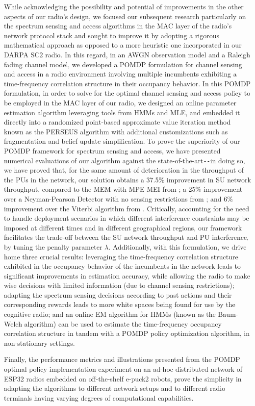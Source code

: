 While acknowledging the possibility and potential of improvements in the other aspects of our radio's design, we focused our subsequent research particularly on the spectrum sensing and access algorithms in the MAC layer of the radio's network protocol stack and sought to improve it by adopting a rigorous mathematical approach as opposed to a more heuristic one incorporated in our DARPA SC2 radio. In this regard, in an AWGN observation model and a Raleigh fading channel model, we developed a POMDP formulation for channel sensing and access in a radio environment involving multiple incumbents exhibiting a time-frequency correlation structure in their occupancy behavior. In this POMDP formulation, in order to solve for the optimal channel sensing and access policy to be employed in the MAC layer of our radio, we designed an online parameter estimation algorithm leveraging tools from HMMs and MLE, and embedded it directly into a randomized point-based approximate value iteration method known as the PERSEUS algorithm with additional customizations such as fragmentation and belief update simplification. To prove the superiority of our POMDP framework for spectrum sensing and access, we have presented numerical evaluations of our algorithm against the state-of-the-art\texttt{-{}-}in doing so, we have proved that, for the same amount of deterioration in the throughput of the PUs in the network, our solution obtains a 37.5\% improvement in SU network throughput, compared to the MEM with MPE-MEI from \cite{WCL:7}; a 25\% improvement over a Neyman-Pearson Detector with no sensing restrictions from \cite{WCL:11}; and 6\% improvement over the Viterbi algorithm from \cite{WCL:6}. Critically, accounting for the need to handle deployment scenarios in which different interference constraints may be imposed at different times and in different geographical regions, our framework facilitates the trade-off between the SU network throughput and PU interference, by tuning the penalty parameter $\lambda$. Additionally, with this formulation, we drive home three crucial results: leveraging the time-frequency correlation structure exhibited in the occupancy behavior of the incumbents in the network leads to significant improvements in estimation accuracy, while allowing the radio to make wise decisions with limited information (due to channel sensing restrictions); adapting the spectrum sensing decisions according to past actions and their corresponding rewards leads to more white spaces being found for use by the cognitive radio; and an online EM algorithm for HMMs (known as the Baum-Welch algorithm) can be used to estimate the time-frequency occupancy correlation structure in tandem with a POMDP policy optimization algorithm, in non-stationary settings.

Finally, the performance metrics and illustrations presented from the POMDP optimal policy implementation experiment on an ad-hoc distributed network of ESP32 radios embedded on off-the-shelf e-puck2 robots, prove the simplicity in adapting the algorithms to different network setups and to different radio terminals having varying degrees of computational capabilities.